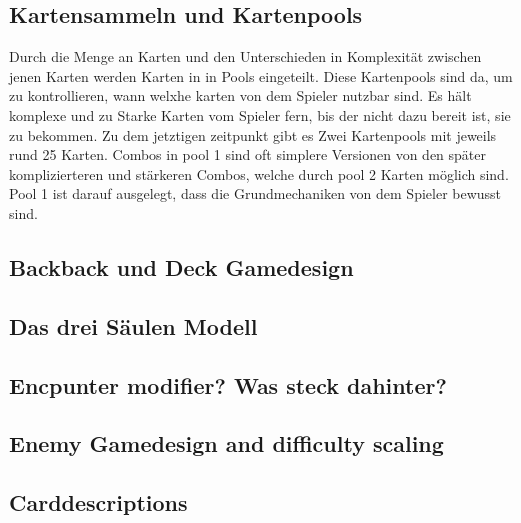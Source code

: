 \subsection{Kartensammeln und Kartenpools}\label{subsec:placementMatters}

Durch die Menge an Karten und den Unterschieden in Komplexität zwischen jenen Karten werden Karten in \FF in Pools eingeteilt.
Diese Kartenpools sind da, um zu kontrollieren, wann welxhe karten von dem Spieler nutzbar sind.
Es hält komplexe und zu Starke Karten vom Spieler fern, bis der nicht dazu bereit ist, sie zu bekommen.
Zu dem jetztigen zeitpunkt gibt es Zwei Kartenpools mit jeweils rund 25 Karten. Combos in pool 1 sind oft simplere
Versionen von den später komplizierteren und stärkeren Combos, welche durch pool 2 Karten möglich sind.
Pool 1 ist darauf ausgelegt, dass die Grundmechaniken von \FF dem Spieler bewusst sind.


\subsection{Backback und Deck Gamedesign}\label{subsec:placementMatters}

\subsection{Das drei Säulen Modell}\label{subsec:placementMatters}

\subsection{Encpunter modifier? Was steck dahinter?}\label{subsec:placementMatters}


\subsection{Enemy Gamedesign and difficulty scaling}\label{subsec:placementMatters}







\subsection{Carddescriptions}\label{subsec:placementMatters}

